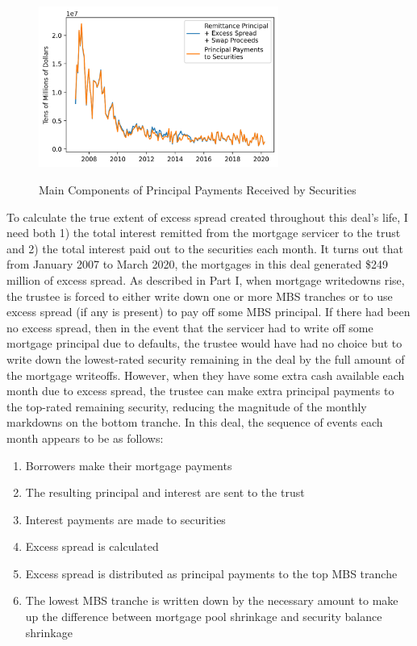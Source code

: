 \documentclass[12pt]{article}
\begin{document}
\begin{figure}[h]
	\centering
	\caption{Main Components of Principal Payments Received by Securities}
	\includegraphics[width=0.7\textwidth]{../figures/timeseries_security_principal_pmts_composition}
	\label{fig:timeseries_security_principal_pmts_composition}
\end{figure}

To calculate the true extent of excess spread created throughout this deal’s life, I need both 1) the total interest remitted from the mortgage servicer to the trust and 2) the total interest paid out to the securities each month. It turns out that from January 2007 to March 2020, the mortgages in this deal generated \$249 million of excess spread. As described in Part I, when mortgage writedowns rise, the trustee is forced to either write down one or more MBS tranches or to use excess spread (if any is present) to pay off some MBS principal. If there had been no excess spread, then in the event that the servicer had to write off some mortgage principal due to defaults, the trustee would have had no choice but to write down the lowest-rated security remaining in the deal by the full amount of the mortgage writeoffs. However, when they have some extra cash available each month due to excess spread, the trustee can make extra principal payments to the top-rated remaining security, reducing the magnitude of the monthly markdowns on the bottom tranche. In this deal, the sequence of events each month appears to be as follows:

\begin{enumerate}
	\item Borrowers make their mortgage payments
	\item The resulting principal and interest are sent to the trust
	\item Interest payments are made to securities
	\item Excess spread is calculated
	\item Excess spread is distributed as principal payments to the top MBS tranche
	\item The lowest MBS tranche is written down by the necessary amount to make up the difference between mortgage pool shrinkage and security balance shrinkage
\end{enumerate}
\end{document}
